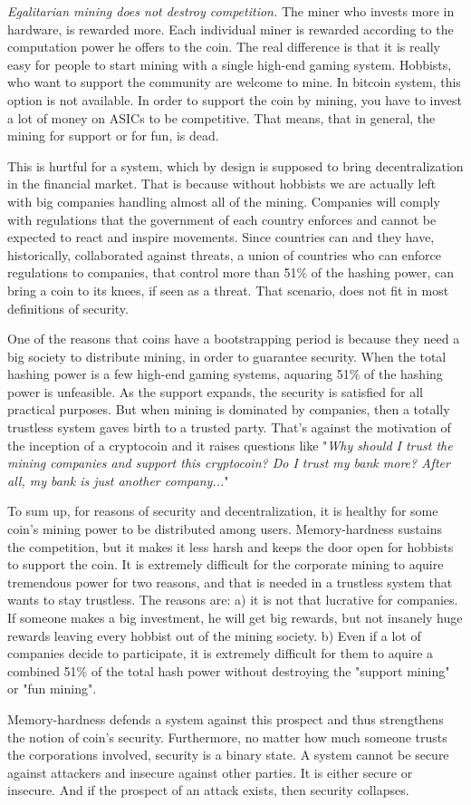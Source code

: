 \emph{Egalitarian mining does not destroy competition.} The miner who invests more in hardware, is rewarded more. Each individual miner is rewarded according to the computation power he offers to the coin. The real difference is that it is really easy for people to start mining with a single high-end gaming system. Hobbists, who want to support the community are welcome to mine. In bitcoin system, this option is not available. In order to support the coin by mining, you have to invest a lot of money on ASICs to be competitive. That means, that in general, the mining for support or for fun, is dead.

This is hurtful for a system, which by design is supposed to bring decentralization in the financial market. That is because without hobbists we are actually left with big companies handling almost all of the mining. Companies will comply with regulations that the government of each country enforces and cannot be expected to react and inspire movements. Since countries can and they have, historically, collaborated against threats, a union of countries who can enforce regulations to companies, that control more than 51\% of the hashing power, can bring a coin to its knees, if seen as a threat. That scenario, does not fit in most definitions of security.

One of the reasons that coins have a bootstrapping period is because they need a big society to distribute mining, in order to guarantee security. When the total hashing power is a few high-end gaming systems, aquaring 51\% of the hashing power is unfeasible. As the support expands, the security is satisfied for all practical purposes. But when mining is dominated by companies, then a totally trustless system gaves birth to a trusted party. That's against the motivation of the inception of a cryptocoin and it raises questions like "\emph{Why should I trust the mining companies and support this cryptocoin? Do I trust my bank more? After all, my bank is just another company...}"

To sum up, for reasons of security and decentralization, it is healthy for some coin's mining power to be distributed among users. Memory-hardness sustains the competition, but it makes it less harsh and keeps the door open for hobbists to support the coin. It is extremely difficult for the corporate mining to aquire tremendous power for two reasons, and that is needed in a trustless system that wants to stay trustless. The reasons are: a) it is not that lucrative for companies. If someone makes a big investment, he will get big rewards, but not insanely huge rewards leaving every hobbist out of the mining society. b) Even if a lot of companies decide to participate, it is extremely difficult for them to aquire a combined 51\% of the total hash power without destroying the "support mining" or "fun mining".

Memory-hardness defends a system against this prospect and thus strengthens the notion of coin's security. Furthermore, no matter how much someone trusts the corporations involved, security is a binary state. A system cannot be secure against attackers and insecure against other parties. It is either secure or insecure. And if the prospect of an attack exists, then security collapses.
%
%
